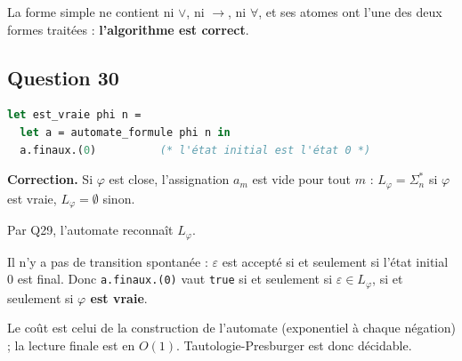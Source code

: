 \documentclass[11pt,a4paper]{article}
\begin{document}
La forme simple ne contient ni \(\vee\), ni \(\to\), ni \(\forall\), et ses atomes ont l'une des deux formes traitées : \textbf{l'algorithme est correct}.

\hypertarget{question-30}{%
\subsection{Question 30}\label{question-30}}

\begin{lstlisting}[language=Caml]
let est_vraie phi n =
  let a = automate_formule phi n in
  a.finaux.(0)          (* l'état initial est l'état 0 *)
\end{lstlisting}

\textbf{Correction.} Si \(\varphi\) est close, l'assignation \(a_m\) est vide pour tout \(m\) : \(L_\varphi=\Sigma_n^*\) si \(\varphi\) est vraie, \(L_\varphi=\emptyset\) sinon.

Par Q29, l'automate reconnaît \(L_\varphi\).

Il n'y a pas de transition spontanée : \(\varepsilon\) est accepté si et seulement si l'état initial \(0\) est final. Donc \texttt{a.finaux.(0)} vaut \texttt{true} si et seulement si \(\varepsilon\in L_\varphi\), si et seulement si \textbf{\(\varphi\) est vraie}.

Le coût est celui de la construction de l'automate (exponentiel à chaque négation) ; la lecture finale est en \(O(1)\). Tautologie-Presburger est donc décidable.
\end{document}
